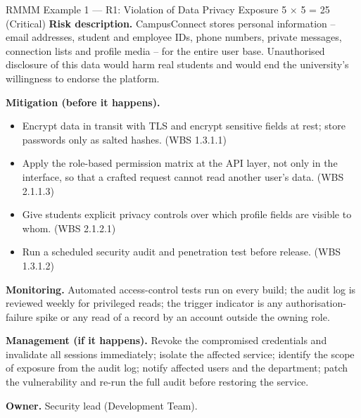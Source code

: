 \documentclass[11pt,a4paper]{report}
\begin{document}
\begin{riskcard}{RMMM Example 1 --- R1: Violation of Data Privacy \hfill Exposure 5 $\times$ 5 = 25 (Critical)}
\textbf{Risk description.} CampusConnect stores personal information -- email
addresses, student and employee IDs, phone numbers, private messages, connection
lists and profile media -- for the entire user base. Unauthorised disclosure of
this data would harm real students and would end the university's willingness to
endorse the platform.

\medskip
\textbf{Mitigation (before it happens).}
\begin{itemize}[nosep]
  \item Encrypt data in transit with TLS and encrypt sensitive fields at rest;
  store passwords only as salted hashes. (WBS 1.3.1.1)
  \item Apply the role-based permission matrix at the API layer, not only in the
  interface, so that a crafted request cannot read another user's data.
  (WBS 2.1.1.3)
  \item Give students explicit privacy controls over which profile fields are
  visible to whom. (WBS 2.1.2.1)
  \item Run a scheduled security audit and penetration test before release.
  (WBS 1.3.1.2)
\end{itemize}

\medskip
\textbf{Monitoring.} Automated access-control tests run on every build; the audit
log is reviewed weekly for privileged reads; the trigger indicator is any
authorisation-failure spike or any read of a record by an account outside the
owning role.

\medskip
\textbf{Management (if it happens).} Revoke the compromised credentials and
invalidate all sessions immediately; isolate the affected service; identify the
scope of exposure from the audit log; notify affected users and the department;
patch the vulnerability and re-run the full audit before restoring the service.

\medskip
\textbf{Owner.} Security lead (Development Team).
\end{riskcard}
\end{document}
